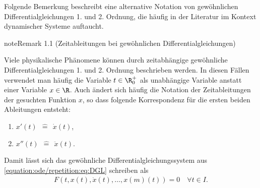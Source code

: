 \documentclass[letterpaper,10pt,english]{jupyterBook}
\begin{document}
\sphinxAtStartPar
Folgende Bemerkung beschreibt eine alternative Notation von gewöhnlichen Differentialgleichungen 1. und 2. Ordnung, die häufig in der Literatur im Kontext dynamischer Systeme auftaucht.
\label{ode/repetition:remark-1}
\begin{sphinxadmonition}{note}{Remark 1.1 (Zeitableitungen bei gewöhnlichen Differentialgleichungen)}



\sphinxAtStartPar
Viele physikalische Phänomene können durch zeitabhängige gewöhnliche Differentialgleichungen 1. und 2. Ordnung beschrieben werden.
In diesen Fällen verwendet man häufig die Variable \(t \in \R^+_0\) als unabhängige Variable anstatt einer Variable \(x \in \R\).
Auch ändert sich häufig die Notation der Zeitableitungen der gesuchten Funktion \(x\), so dass folgende Korrespondenz für die ersten beiden Ableitungen entsteht:
\begin{enumerate}
%
\item {} 
\sphinxAtStartPar
\(x'(t) \ \ \hat{=} \ \ \dot{x}(t)\),

\item {} 
\sphinxAtStartPar
\(x''(t) \ \ \hat{=} \ \ \ddot{x}(t)\).

\end{enumerate}

\sphinxAtStartPar
Damit lässt sich das gewöhnliche Differentialgleichungssystem aus \eqref{equation:ode/repetition:eq:DGL} schreiben als
\begin{equation}\label{equation:ode/repetition:eq:DGLtime}
\begin{split}F(t, x(t), \dot{x}(t), \ldots, x{(m)}(t)) = 0 \quad \forall t\in I.\end{split}
\end{equation}\end{sphinxadmonition}
\end{document}
